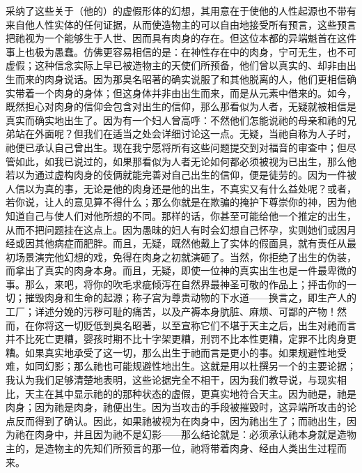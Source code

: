 采纳了这些关于（他的）的虚假形体的幻想，其用意在于使他的人性起源也不带有来自他人性实体的任何证据，从而使造物主的可以自由地接受所有预言，这些预言把祂视为一个能够生于人世、因而具有肉身的存在。但这位本都的异端魁首在这件事上也极为愚蠢。仿佛更容易相信的是：在神性存在中的肉身，宁可无生，也不可虚假；这种信念实际上早已被造物主的天使们所预备，他们曾以真实的、却非由出生而来的肉身说话。因为那臭名昭著的确实说服了和其他脱离的人，他们更相信确实带着一个肉身的身体；但这身体并非由出生而来，而是从元素中借来的。如今，既然担心对肉身的信仰会包含对出生的信仰，那么那看似为人者，无疑就被相信是真实而确实地出生了。因为有一个妇人曾高呼：不然他们怎能说祂的母亲和祂的兄弟站在外面呢？但我们在适当之处会详细讨论这一点。无疑，当祂自称为人子时，祂便已承认自己曾出生。现在我宁愿将所有这些问题提交到对福音的审查中；但尽管如此，如我已说过的，如果那看似为人者无论如何都必须被视为已出生，那么他若以为通过虚构肉身的伎俩就能完善对自己出生的信仰，便是徒劳的。因为一件被人信以为真的事，无论是他的肉身还是他的出生，不真实又有什么益处呢？或者，若你说，让人的意见算不得什么；那么你就是在欺骗的掩护下尊崇你的神，因为他知道自己与使人们对他所想的不同。那样的话，你甚至可能给他一个推定的出生，从而不把问题挂在这点上。因为愚昧的妇人有时会幻想自己怀孕，实则她们或因月经或因其他病症而肥胖。而且，无疑，既然他戴上了实体的假面具，就有责任从最初场景演完他幻想的戏，免得在肉身之初就演砸了。当然，你拒绝了出生的伪装，而拿出了真实的肉身本身。而且，无疑，即使一位神的真实出生也是一件最卑微的事。那么，来吧，将你的吹毛求疵倾泻在自然界最神圣可敬的作品上；抨击你的一切；摧毁肉身和生命的起源；称子宫为尊贵动物的下水道——换言之，即生产人的工厂；详述分娩的污秽可耻的痛苦，以及产褥本身肮脏、麻烦、可鄙的产物！然而，在你将这一切贬低到臭名昭著，以至宣称它们不堪于天主之后，出生对祂而言并不比死亡更糟，婴孩时期不比十字架更糟，刑罚不比本性更糟，定罪不比肉身更糟。如果真实地承受了这一切，那么出生于祂而言是更小的事。如果规避性地受难，如同幻影；那么祂也可能规避性地出生。这就是用以杜撰另一个的主要论据；我认为我们足够清楚地表明，这些论据完全不相干，因为我们教导说，与现实相比，天主在其中显示祂的的那种状态的虚假，更真实地符合天主。因为祂是，祂是肉身；因为祂是肉身，祂便出生。因为当攻击的手段被摧毁时，这异端所攻击的论点反而得到了确认。因此，如果祂被视为在肉身中，因为祂出生了；而祂出生，因为祂在肉身中，并且因为祂不是幻影——那么结论就是：必须承认祂本身就是造物主的，是造物主的先知们所预言的那一位，祂将带着肉身、经由人类出生过程而来。\par

